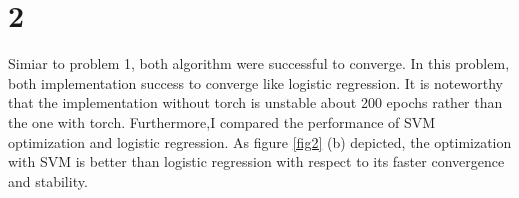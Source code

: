 \documentclass[10pt]{article}
\begin{document}
\section*{2}
Simiar to problem 1, both algorithm were successful to converge. In this problem, both implementation success to converge like logistic regression.
It is noteworthy that the implementation without torch is unstable about 200 epochs rather than the one with torch. 
Furthermore,I compared the performance of SVM optimization and logistic regression. As figure \ref{fig2} (b) depicted, the optimization with SVM is better than logistic regression with respect to its faster convergence and stability.
\end{document}
